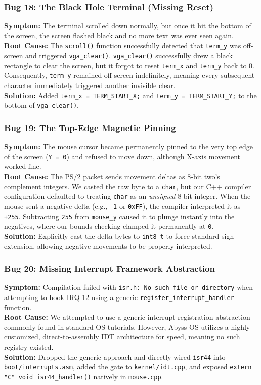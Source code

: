 \documentclass[12pt,a4paper]{report}
\begin{document}
\subsubsection*{Bug 18: The Black Hole Terminal (Missing Reset)}
\textbf{Symptom:} The terminal scrolled down normally, but once it hit the bottom of the screen, the screen flashed black and no more text was ever seen again.\\
\textbf{Root Cause:} The \texttt{scroll()} function successfully detected that \texttt{term\_y} was off-screen and triggered \texttt{vga\_clear()}. \texttt{vga\_clear()} successfully drew a black rectangle to clear the screen, but it forgot to reset \texttt{term\_x} and \texttt{term\_y} back to 0. Consequently, \texttt{term\_y} remained off-screen indefinitely, meaning every subsequent character immediately triggered another invisible clear.\\
\textbf{Solution:} Added \texttt{term\_x = TERM\_START\_X;} and \texttt{term\_y = TERM\_START\_Y;} to the bottom of \texttt{vga\_clear()}.

\subsubsection*{Bug 19: The Top-Edge Magnetic Pinning}
\textbf{Symptom:} The mouse cursor became permanently pinned to the very top edge of the screen (\texttt{Y = 0}) and refused to move down, although X-axis movement worked fine.\\
\textbf{Root Cause:} The PS/2 packet sends movement deltas as 8-bit two's complement integers. We casted the raw byte to a \texttt{char}, but our C++ compiler configuration defaulted to treating \texttt{char} as an \textit{unsigned} 8-bit integer. When the mouse sent a negative delta (e.g., \texttt{-1} or \texttt{0xFF}), the compiler interpreted it as \texttt{+255}. Subtracting \texttt{255} from \texttt{mouse\_y} caused it to plunge instantly into the negatives, where our bounds-checking clamped it permanently at \texttt{0}.\\
\textbf{Solution:} Explicitly cast the delta bytes to \texttt{int8\_t} to force standard sign-extension, allowing negative movements to be properly interpreted.

\subsubsection*{Bug 20: Missing Interrupt Framework Abstraction}
\textbf{Symptom:} Compilation failed with \texttt{isr.h: No such file or directory} when attempting to hook IRQ 12 using a generic \texttt{register\_interrupt\_handler} function.\\
\textbf{Root Cause:} We attempted to use a generic interrupt registration abstraction commonly found in standard OS tutorials. However, Abyss OS utilizes a highly customized, direct-to-assembly IDT architecture for speed, meaning no such registry existed.\\
\textbf{Solution:} Dropped the generic approach and directly wired \texttt{isr44} into \texttt{boot/interrupts.asm}, added the gate to \texttt{kernel/idt.cpp}, and exposed \texttt{extern "C" void isr44\_handler()} natively in \texttt{mouse.cpp}.
\end{document}
